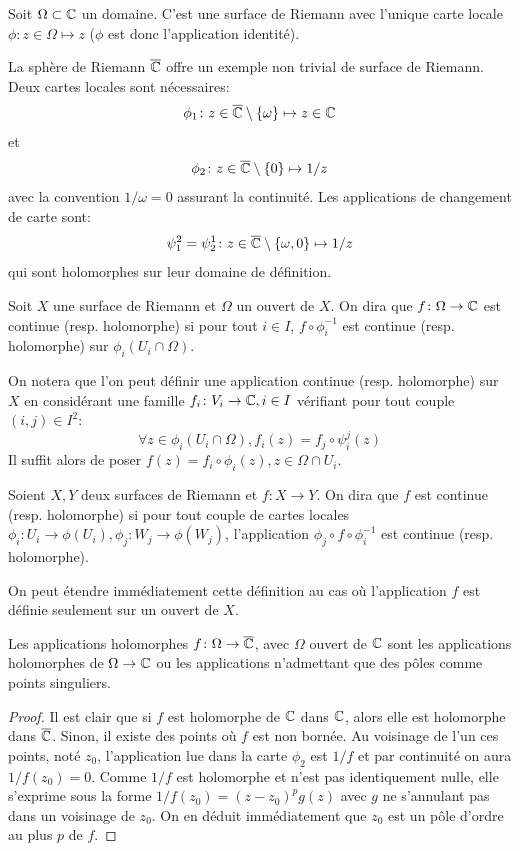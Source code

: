 \begin{exem}
Soit $\Omega \subset \mathbb{C}$ un domaine. C'est une surface de Riemann avec l'unique carte locale $\phi \colon z \in \Omega \mapsto z$ ($\phi$ est donc l'application identité).
\end{exem}
\begin{exem}
La sphère de Riemann $\overline{\mathbb{C}}$ offre un exemple non trivial de surface de Riemann. Deux cartes locales sont nécessaires:
\[
    \phi_1 \colon z \in \overline{\mathbb{C}} \setminus \{\omega\} \mapsto z \in \mathbb{C}
\]
et
\[
\phi_2 \colon z \in \overline{\mathbb{C}} \setminus \{0\} \mapsto 1/z
\]
avec la convention $1/\omega=0$ assurant la continuité. Les applications de changement de carte sont:
\[
\psi_1^2 =\psi_2^1 \colon z \in \overline{\mathbb{C}} \setminus \{\omega,0\} \mapsto 1/z
\]
qui sont holomorphes sur leur domaine de définition.
\end{exem}
\begin{defn}
	Soit $X$ une surface de Riemann et $\Omega$ un ouvert de $X$. On dira que $f \colon \Omega \to \mathbb{C}$ est continue (resp. holomorphe) si pour tout $i \in I$, $f \circ \phi_i^{-1}$ est continue (resp. holomorphe) sur $\phi_i(U_i \cap \Omega)$.
\end{defn}
On notera que l'on peut définir une application continue (resp. holomorphe) sur $X$ en considérant une famille $f_i \colon V_i \to \mathbb{C}, i \in I$ vérifiant pour tout couple $(i,j)\in I^2$:
\[
\forall z \in \phi_i(U_i \cap \Omega), f_i(z) = f_j \circ \psi_i^j(z)
\]
Il suffit alors de poser $f(z)=f_i \circ \phi_i(z), z \in \Omega \cap U_i$.
\begin{defn}
Soient $X,Y$ deux surfaces de Riemann et $f \colon X \to Y$. On dira que $f$ est continue (resp. holomorphe) si pour tout couple de cartes locales $\phi_i \colon U_i \to \phi(U_i), \phi_j \colon W_j \to \phi(W_j)$, l'application $\phi_j \circ f \circ \phi_i^{-1}$ est continue (resp. holomorphe).
\end{defn}
\begin{rem}
On peut étendre immédiatement cette définition au cas où l'application $f$ est définie seulement sur un ouvert de $X$.
\end{rem}
\begin{prop}
Les applications holomorphes $f \colon \Omega \to \overline{\mathbb{C}}$, avec $\Omega$ ouvert de $\mathbb{C}$ sont les applications holomorphes de $\Omega \to \mathbb{C}$ ou les applications n'admettant que des pôles comme points singuliers. 
\end{prop}
\begin{proof}
    Il est clair que si $f$ est holomorphe de $\mathbb{C}$ dans $\mathbb{C}$, alors elle est holomorphe dans $\overline{\mathbb{C}}$. Sinon, il existe des points où $f$ est non bornée. Au voisinage de l'un ces points, noté $z_0$, l'application lue dans la carte $\phi_2$ est $1/f$ et par continuité on aura $1/f(z_0) = 0$. Comme $1/f$ est holomorphe et n'est pas identiquement nulle, elle s'exprime sous la forme $1/f(z_0) = (z-z_0)^p g(z)$ avec $g$ ne s'annulant pas dans un voisinage de $z_0$. On en déduit immédiatement que $z_0$ est un pôle d'ordre au plus $p$ de $f$. 
\end{proof}
